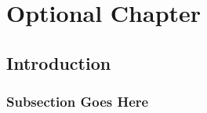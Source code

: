 \chapter{Optional Chapter}
\label{chap:new_chapter}
\section{Introduction}
\subsection{Subsection Goes Here}
